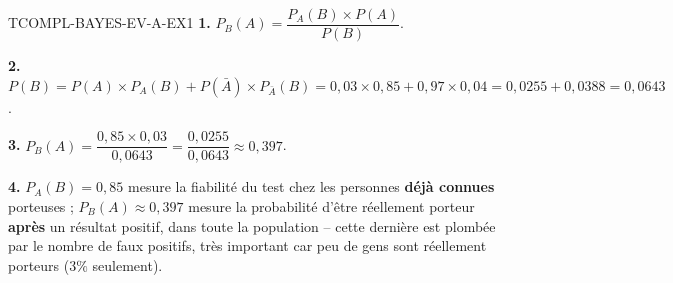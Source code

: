 \begin{corrige}{TCOMPL-BAYES-EV-A-EX1}
\textbf{1.} $P_B(A) = \dfrac{P_A(B)\times P(A)}{P(B)}$.

\textbf{2.} $P(B) = P(A)\times P_A(B) + P(\bar A)\times P_{\bar A}(B) = 0{,}03\times0{,}85+0{,}97\times0{,}04 = 0{,}0255+0{,}0388 = 0{,}0643$.

\textbf{3.} $P_B(A) = \dfrac{0{,}85\times0{,}03}{0{,}0643} = \dfrac{0{,}0255}{0{,}0643} \approx 0{,}397$.

\textbf{4.} $P_A(B)=0{,}85$ mesure la fiabilité du test chez les personnes \textbf{déjà connues} porteuses ; $P_B(A)\approx0{,}397$ mesure la probabilité d'être réellement porteur \textbf{après} un résultat positif, dans toute la population -- cette dernière est plombée par le nombre de faux positifs, très important car peu de gens sont réellement porteurs ($3\%$ seulement).
\end{corrige}
